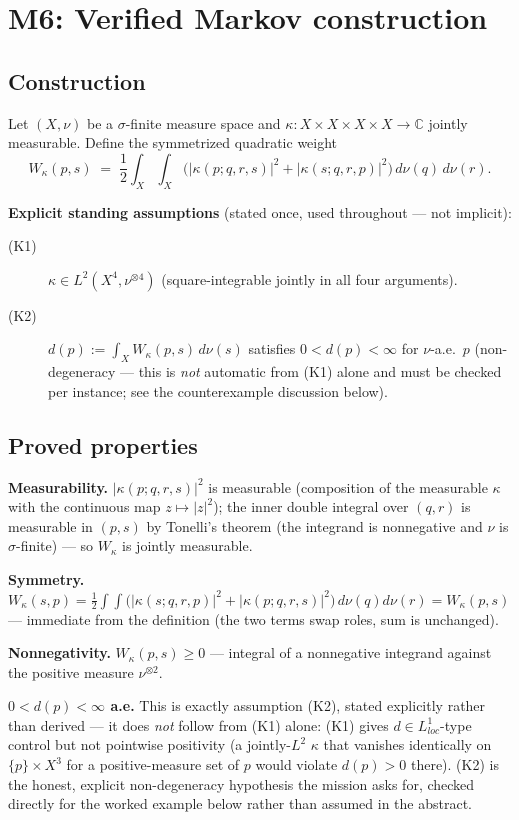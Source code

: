 \section*{M6: Verified Markov construction}

\subsection*{Construction}

Let $(X,\nu)$ be a $\sigma$-finite measure space and
$\kappa: X\times X\times X\times X \to \mathbb{C}$ jointly measurable.
Define the symmetrized quadratic weight
\[
  W_\kappa(p,s) \;=\; \frac12\int_X\!\int_X
    \Big( |\kappa(p;q,r,s)|^2 + |\kappa(s;q,r,p)|^2 \Big)
    \,d\nu(q)\,d\nu(r).
\]

\textbf{Explicit standing assumptions} (stated once, used throughout —
not implicit):
\begin{description}
  \item[(K1)] $\kappa\in L^2(X^4, \nu^{\otimes 4})$ (square-integrable
    jointly in all four arguments).
  \item[(K2)] $d(p) := \int_X W_\kappa(p,s)\,d\nu(s)$ satisfies
    $0 < d(p) < \infty$ for $\nu$-a.e.\ $p$ (non-degeneracy — this is
    \emph{not} automatic from (K1) alone and must be checked per
    instance; see the counterexample discussion below).
\end{description}

\subsection*{Proved properties}

\textbf{Measurability.} $|\kappa(p;q,r,s)|^2$ is measurable (composition
of the measurable $\kappa$ with the continuous map $z\mapsto|z|^2$); the
inner double integral over $(q,r)$ is measurable in $(p,s)$ by
Tonelli's theorem (the integrand is nonnegative and $\nu$ is
$\sigma$-finite) — so $W_\kappa$ is jointly measurable.

\textbf{Symmetry.} $W_\kappa(s,p) = \frac12\int\!\int
\big(|\kappa(s;q,r,p)|^2+|\kappa(p;q,r,s)|^2\big)\,d\nu(q)d\nu(r) =
W_\kappa(p,s)$ — immediate from the definition (the two terms swap
roles, sum is unchanged).

\textbf{Nonnegativity.} $W_\kappa(p,s)\ge0$ — integral of a nonnegative
integrand against the positive measure $\nu^{\otimes2}$.

\textbf{$0<d(p)<\infty$ a.e.} This is exactly assumption (K2), stated
explicitly rather than derived — it does \emph{not} follow from (K1)
alone: (K1) gives $d\in L^1_{loc}$-type control but not pointwise
positivity (a jointly-$L^2$ $\kappa$ that vanishes identically on
$\{p\}\times X^3$ for a positive-measure set of $p$ would violate
$d(p)>0$ there). (K2) is the honest, explicit non-degeneracy hypothesis
the mission asks for, checked directly for the worked example below
rather than assumed in the abstract.

